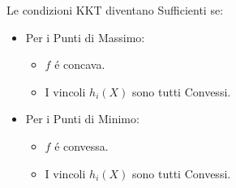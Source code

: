 \documentclass[12pt, a4paper, openany]{book}
\begin{document}
Le condizioni KKT diventano Sufficienti se:
\begin{itemize}
	\item Per i Punti di Massimo:
	 \begin{itemize}
		\item $f$ é concava.
		\item I vincoli $h_i(X)$ sono tutti Convessi.
	\end{itemize}
	\item Per i Punti di Minimo:
	\begin{itemize}
	   \item $f$ é convessa.
	   \item I vincoli $h_i(X)$ sono tutti Convessi.
   \end{itemize}
\end{itemize}
\end{document}
